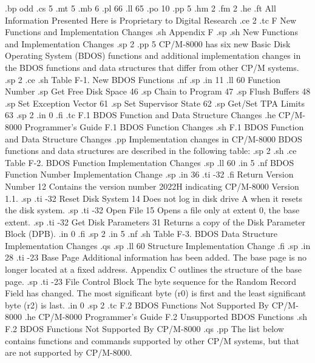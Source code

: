 .bp odd
.cs 5
.mt 5
.mb 6
.pl 66
.ll 65
.po 10
.pp 5
.hm 2
.fm 2
.he 
.ft All Information Presented Here is Proprietary to Digital Research
.ce 2
.tc F  New Functions and Implementation Changes
.sh
Appendix F
.sp
.sh
    New Functions and Implementation Changes
.sp 2
.pp 5
CP/M-8000 has six new Basic Disk Operating System (BDOS) functions
and additional implementation changes in the BDOS functions and
data structures that differ from other CP/M systems. 
.sp 2
.ce
.sh
Table F-1.  New BDOS Functions
.nf
.sp
.in 11
.ll 60
          Function                 Number
.sp
     Get Free Disk Space             46
.sp
     Chain to Program                47
.sp
     Flush Buffers                   48
.sp 
     Set Exception Vector            61
.sp
     Set Supervisor State            62
.sp
     Get/Set TPA Limits              63
.sp 2
.in 0
.fi
.tc    F.1  BDOS Function and Data Structure Changes
.he CP/M-8000 Programmer's Guide            F.1  BDOS Function Changes
.sh
F.1  BDOS Function and Data Structure Changes
.pp
Implementation changes in CP/M-8000 BDOS functions and data structures
are described in the following table:
.sp 2 
.sh
.ce
Table F-2.  BDOS Function Implementation Changes
.sp
.ll 60
.in 5
.nf
   BDOS Function       Number       Implementation  
                                        Change
.sp
.in 36
.ti -32
.fi
Return Version Number     12    Contains the version number 2022H indicating 
CP/M-8000 Version 1.1.
.sp
.ti -32
Reset Disk System         14    Does not log in disk drive A when it resets 
the disk system.
.sp
.ti -32
Open File                 15    Opens a file only at extent 0, the base extent.
.sp
.ti -32
Get Disk Parameters       31    Returns a copy of the Disk Parameter Block 
(DPB).
.in 0
.fi
.sp 2
.in 5
.nf
.sh
Table F-3.  BDOS Data Structure Implementation Changes
.qs
.sp
.ll 60
     Structure                  Implementation  
                                    Change
.fi
.sp
.in 28
.ti -23
Base Page              Additional information has been added.  The base page 
is no longer located at a fixed address.  Appendix C outlines the structure 
of the base page.
.sp
.ti -23
File Control Block     The byte sequence for the Random Record Field has 
changed.  The most significant byte (r0) is first and the least significant 
byte (r2) is last. 
.in 0
.sp 2
.tc    F.2  BDOS Functions Not Supported By CP/M-8000
.he CP/M-8000 Programmer's Guide       F.2  Unsupported BDOS Functions
.sh
F.2  BDOS Functions Not Supported By CP/M-8000 
.qs
.pp
The list below contains functions and commands supported by other CP/M
systems, but that are not supported by CP/M-8000. 
